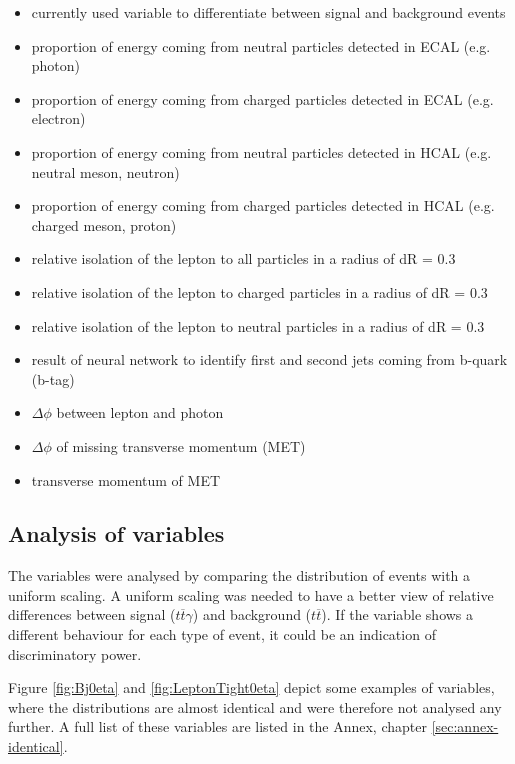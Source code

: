 \documentclass[11pt]{scrartcl}
\begin{document}
\begin{itemize}
  		\item currently used variable to differentiate between signal and background events
   		\item proportion of energy coming from neutral particles detected in ECAL (e.g. photon)
		\item proportion of energy coming from charged particles detected in ECAL (e.g. electron)
		\item proportion of energy coming from neutral particles detected in HCAL (e.g. neutral meson, neutron)
		\item proportion of energy coming from charged particles detected in HCAL (e.g. charged meson, proton)
  		\item relative isolation of the lepton to all particles in a radius of dR = 0.3 %
		\item relative isolation of the lepton to charged particles in a radius of dR = 0.3 %
		\item relative isolation of the lepton to neutral particles in a radius of dR = 0.3 %
		\item result of neural network to identify first and second jets coming from b-quark (b-tag)
		\item $\Delta\phi$ between lepton and photon
		\item $\Delta\phi$ of missing transverse momentum (MET)
		\item transverse momentum of MET
\end{itemize}

	\subsection{Analysis of variables}
	
The variables were analysed by comparing the distribution of events with a uniform scaling. A uniform scaling was needed to have a better view of relative differences between signal ($t\overline{t}\gamma$) and background ($t\overline{t}$). If the variable shows a different behaviour for each type of event, it could be an indication of discriminatory power. 

Figure \ref{fig:Bj0eta} and \ref{fig:LeptonTight0eta} depict some examples of variables, where the distributions are almost identical and were therefore not analysed any further. A full list of these variables are listed in the Annex, chapter \ref{sec:annex-identical}. 
\end{document}
